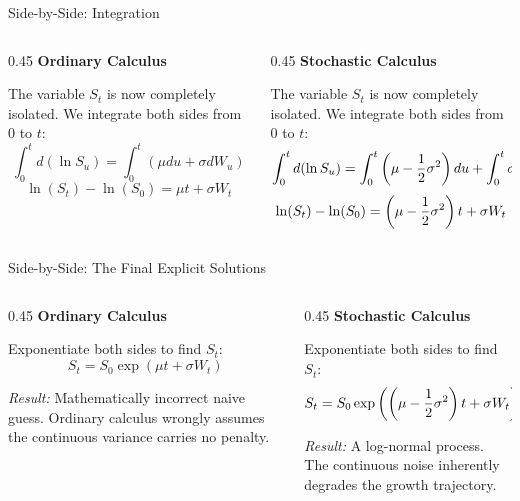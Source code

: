 \documentclass{beamer}
\begin{document}
\begin{frame}{Side-by-Side: Integration}
\begin{columns}[T]
\begin{column}{0.45\textwidth}
\textbf{Ordinary Calculus}
\vspace{0.3cm}

The variable $S_t$ is now completely isolated. We integrate both sides from $0$ to $t$:
\[ \int_0^t d(\ln S_u) = \int_0^t (\mu du + \sigma dW_u) \]
\[ \ln(S_t) - \ln(S_0) = \mu t + \sigma W_t \]
\end{column}
\hfill\vrule\hfill
\begin{column}{0.45\textwidth}
\textbf{Stochastic Calculus}
\vspace{0.3cm}

The variable $S_t$ is now completely isolated. We integrate both sides from $0$ to $t$:
\[ \int_0^t d(\ln S_u) = \int_0^t \left(\mu - \frac{1}{2}\sigma^2\right) du 

\hfill + \int_0^t \sigma dW_u \]
\[ \ln(S_t) - \ln(S_0) = \left(\mu - \frac{1}{2}\sigma^2\right)t 

\hfill \hfill + \sigma W_t \]
\end{column}
\end{columns}
\end{frame}

\begin{frame}{Side-by-Side: The Final Explicit Solutions}
\begin{columns}[T]
\begin{column}{0.45\textwidth}
\textbf{Ordinary Calculus}
\vspace{0.3cm}

Exponentiate both sides to find $S_t$:
\[ S_t = S_0 \exp(\mu t + \sigma W_t) \]

\vspace{1.2cm}
\textit{Result:} Mathematically incorrect naive guess. Ordinary calculus wrongly assumes the continuous variance carries no penalty.
\end{column}
\hfill\vrule\hfill
\begin{column}{0.45\textwidth}
\textbf{Stochastic Calculus}
\vspace{0.3cm}

Exponentiate both sides to find $S_t$:
\[ S_t = S_0 \exp\left( \left(\mu - \frac{1}{2}\sigma^2\right)t 

\hfill + \sigma W_t \right) \]

\vspace{0.3cm}
\textit{Result:} A log-normal process. The continuous noise inherently degrades the growth trajectory.
\end{column}
\end{columns}
\end{frame}
\end{document}
